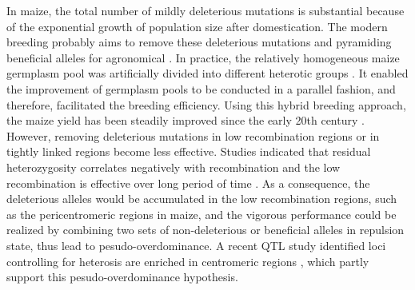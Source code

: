 \documentclass[9pt,twocolumn,twoside]{gsajnl}
\begin{document}
In maize, the total number of mildly deleterious mutations is substantial because of the exponential growth of population size after domestication. The modern breeding probably aims to remove these deleterious mutations and pyramiding beneficial alleles for agronomical \DIFdelbegin {}\DIFdelend \DIFaddbegin {}\DIFaddend . In practice, the relatively homogeneous maize germplasm pool was artificially divided into different heterotic groups \citep{Heerwaarden2012}. It enabled the improvement of germplasm pools to be conducted in a parallel fashion, and therefore, facilitated the breeding efficiency. Using this hybrid breeding approach, the maize yield has been steadily improved since the early 20th century \citep{duvick2001biotechnology}. However, removing deleterious mutations in low recombination regions or in tightly linked regions become less effective. Studies indicated that residual heterozygosity correlates negatively with recombination \citep{Gore2009, McMullen2009} and the low recombination is effective over long period of time \citep{Haddrill2007}. As a consequence, the deleterious alleles would be accumulated in the low recombination regions, such as the pericentromeric regions in maize, and the vigorous performance could be realized by combining two sets of non-deleterious or beneficial alleles in repulsion state, thus lead to pesudo-overdominance. A recent QTL study identified loci controlling for heterosis are enriched in centromeric regions \citep{Lariepe2012}, which partly support this pesudo-overdominance hypothesis.
\end{document}
